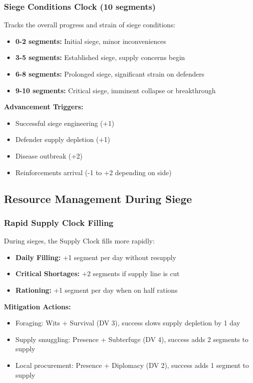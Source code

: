 \subsubsection{Siege Conditions Clock (10 segments)}
Tracks the overall progress and strain of siege conditions:
\begin{itemize}[leftmargin=*]
    \item \textbf{0-2 segments:} Initial siege, minor inconveniences
    \item \textbf{3-5 segments:} Established siege, supply concerns begin
    \item \textbf{6-8 segments:} Prolonged siege, significant strain on defenders
    \item \textbf{9-10 segments:} Critical siege, imminent collapse or breakthrough
\end{itemize}

\textbf{Advancement Triggers:}
\begin{itemize}[leftmargin=*]
    \item Successful siege engineering (+1)
    \item Defender supply depletion (+1)
    \item Disease outbreak (+2)
    \item Reinforcements arrival (-1 to +2 depending on side)
\end{itemize}

\subsection{Resource Management During Siege}

\subsubsection{Rapid Supply Clock Filling}
During sieges, the Supply Clock fills more rapidly:
\begin{itemize}[leftmargin=*]
    \item \textbf{Daily Filling:} +1 segment per day without resupply
    \item \textbf{Critical Shortages:} +2 segments if supply line is cut
    \item \textbf{Rationing:} +1 segment per day when on half rations
\end{itemize}

\textbf{Mitigation Actions:}
\begin{itemize}[leftmargin=*]
    \item Foraging: Wits + Survival (DV 3), success slows supply depletion by 1 day
    \item Supply smuggling: Presence + Subterfuge (DV 4), success adds 2 segments to supply
    \item Local procurement: Presence + Diplomacy (DV 2), success adds 1 segment to supply
\end{itemize}


